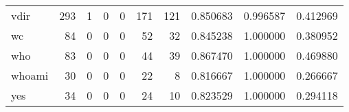 \begin{tabular}{lrrrrrrrrr}
vdir      &                                       293 &                                                  1 &                                                  0 &                                                  0 &                                                171 &                                                121 &                                           0.850683 &                               0.996587 &                             0.412969 \\
wc        &                                        84 &                                                  0 &                                                  0 &                                                  0 &                                                 52 &                                                 32 &                                           0.845238 &                               1.000000 &                             0.380952 \\
who       &                                        83 &                                                  0 &                                                  0 &                                                  0 &                                                 44 &                                                 39 &                                           0.867470 &                               1.000000 &                             0.469880 \\
whoami    &                                        30 &                                                  0 &                                                  0 &                                                  0 &                                                 22 &                                                  8 &                                           0.816667 &                               1.000000 &                             0.266667 \\
yes       &                                        34 &                                                  0 &                                                  0 &                                                  0 &                                                 24 &                                                 10 &                                           0.823529 &                               1.000000 &                             0.294118 \\
\bottomrule
\end{tabular}
